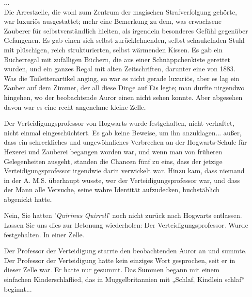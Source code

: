 {...\\ Die Arrestzelle, die wohl zum Zentrum der magischen Strafverfolgung gehörte, war luxuriös ausgestattet; mehr eine Bemerkung zu dem, was erwachsene Zauberer für selbstverständlich hielten, als irgendein besonderes Gefühl gegenüber Gefangenen. Es gab einen sich selbst zurücklehnenden, selbst schaukelnden Stuhl mit plüschigen, reich strukturierten, selbst wärmenden Kissen. Es gab ein Bücherregal mit zufälligen Büchern, die aus einer Schnäppchenkiste gerettet wurden, und ein ganzes Regal mit alten Zeitschriften, darunter eine von 1883. Was die Toilettenartikel anging, so war es nicht gerade luxuriös, aber es lag ein Zauber auf dem Zimmer, der all diese Dinge auf Eis legte; man durfte nirgendwo hingehen, wo der beobachtende Auror einen nicht sehen konnte. Aber abgesehen davon war es eine recht angenehme kleine Zelle.

Der Verteidigungsprofessor von Hogwarts wurde festgehalten, nicht verhaftet, nicht einmal eingeschüchtert. Es gab keine Beweise, um ihn anzuklagen... außer, dass ein schreckliches und ungewöhnliches Verbrechen an der Hogwarts-Schule für Hexerei und Zauberei begangen worden war, und wenn man von früheren Gelegenheiten ausgeht, standen die Chancen fünf zu eins, dass der jetzige Verteidigungsprofessor irgendwie darin verwickelt war. Hinzu kam, dass niemand in der A. M.S. überhaupt wusste, wer der Verteidigungsprofessor war, und dass der Mann alle Versuche, seine wahre Identität aufzudecken, buchstäblich abgenickt hatte.

Nein, Sie hatten '\emph{Quirinus Quirrell}' noch nicht zurück nach Hogwarts entlassen. Lassen Sie uns dies zur Betonung wiederholen: Der Verteidigungsprofessor. Wurde festgehalten. In einer Zelle.

Der Professor der Verteidigung starrte den beobachtenden Auror an und summte.\\ Der Professor der Verteidigung hatte kein einziges Wort gesprochen, seit er in dieser Zelle war. Er hatte nur gesummt. Das Summen begann mit einem einfachen Kinderschlaflied, das in Muggelbritannien mit „Schlaf, Kindlein schlaf“ beginnt...

}
